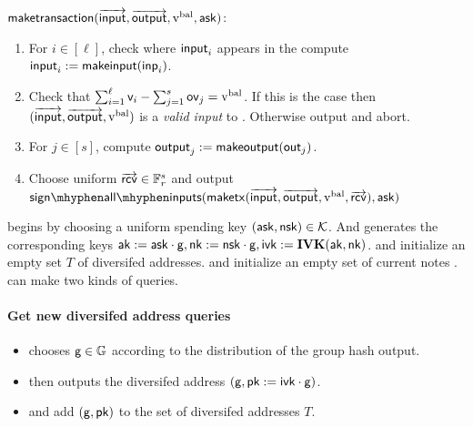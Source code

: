 \documentclass[11pt]{article}
\numberwithin{equation}{section} %
\numberwithin{figure}{section} %
\newcommand{\inp}{\ensuremath{\mathsf{inp}}\xspace}
\newcommand{\out}{\ensuremath{\mathsf{out}}\xspace}
\begin{document}
\underline{$\mathsf{maketransaction}(\overrightarrow{\mathsf{input}},\overrightarrow{\mathsf{output}},\mathrm{v^{bal}},\mathsf{ask})$}:
\begin{enumerate}
 \item For $i\in [\ell]$, check where $\mathsf{input}_i$ appears in the compute $\input_i\defeq \makeinput({{\inp}}_i)$.
\item Check that $\sum_{i=1}^\ell \mathsf{v}_i - \sum_{j=1}^s \mathsf{ov}_j=\mathrm{v^{bal}}$.
If this is the case then $(\overrightarrow{\mathsf{input}},\overrightarrow{\mathsf{output}},\mathrm{v^{bal}})$ is a \emph{valid input} to \maketransaction.
Otherwise output \rej and abort.
 \item For $j\in [s]$, compute $\output_j \defeq \makeoutput({\out_j})$.
 \item Choose uniform $\overrightarrow{\mathsf{rcv}}\in {\mathbb F}_r^s$ and output $\signallinputs(\maketx{(\inputs,\outputs,\vbal,\rcvs)},\ask)$
 
\end{enumerate}

\oracle begins by choosing a uniform spending key $(\mathsf{ask},\mathsf{nsk})\in{\mathcal K}$.
And generates the corresponding keys $\mathsf{ak}:= \mathsf{ask}\cdot \mathsf{g} ,\mathsf{nk}:= \mathsf{nsk}\cdot\mathsf{g}, \mathsf{ivk} :=\mathbf{IVK}(\mathsf{ak},\mathsf{nk})$. 
\adv and \oracle initialize an empty set $T$ of diversifed addresses.
 \adv and \oracle initialize an empty set of current notes \curnotes. 
\adv can make two kinds of queries.

\paragraph{Get new diversifed address queries}
\begin{itemize}
\item\oracle chooses $\mathsf{g}\in \mathbb{G}$ according to the distribution \GH of the group hash output.
\item\oracle then outputs the diversifed address $(\mathsf{g},\mathsf{pk} := \mathsf{ivk}\cdot \mathsf{g})$.
\item \adv and \oracle add $(\mathsf{g},\mathsf{pk})$ to the set of diversifed addresses $T$.
\end{itemize}
\end{document}
